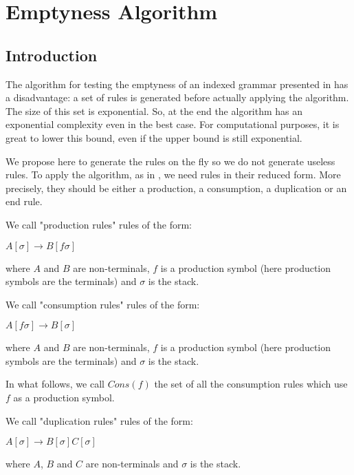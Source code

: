 \section{Emptyness Algorithm}

\subsection{Introduction}
\label{introAlgo}

The algorithm for testing the emptyness of an indexed grammar presented in \cite{aho68} has a disadvantage: a set of rules is generated before actually applying the algorithm. The size of this set is exponential. So, at the end the algorithm has an exponential complexity even in the best case. For computational purposes, it is great to lower this bound, even if the upper bound is still exponential.

We propose here to generate the rules on the fly so we do not generate useless rules. To apply the algorithm, as in \cite{aho68}, we need rules in their reduced form. More precisely, they should be either a production, a consumption, a duplication or an end rule.

\begin{Definition}
We call "production rules" rules of the form:

$A[\sigma] \rightarrow B[f \sigma]$

where $A$ and $B$ are non-terminals, $f$ is a production symbol (here production symbols are the terminals) and $\sigma$ is the stack.
\end{Definition}

\begin{Definition}
We call "consumption rules" rules of the form:

$A[f \sigma] \rightarrow B[\sigma]$

where $A$ and $B$ are non-terminals, $f$ is a production symbol (here production symbols are the terminals) and $\sigma$ is the stack.

In what follows, we call $Cons(f)$ the set of all the consumption rules which use $f$ as a production symbol.
\end{Definition}

\begin{Definition}
We call "duplication rules" rules of the form:

$A[\sigma] \rightarrow B[\sigma] C[\sigma]$

where $A$, $B$ and $C$ are non-terminals and $\sigma$ is the stack.
\end{Definition}

